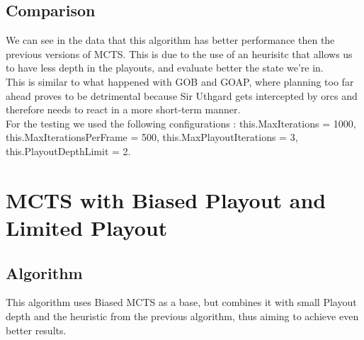 \documentclass{article}
\begin{document}
  \subsection{Comparison}
  We can see in the data that this algorithm has better performance then the previous versions of MCTS. This is due to the use of an heurisitc that allows us to have less
  depth in the playouts, and evaluate better the state we're in. \\
  This is similar to what happened with GOB and GOAP, where planning too far ahead proves to be detrimental because Sir Uthgard gets intercepted by orcs and 
  therefore needs to react in a more short-term manner.\\
  For the testing we used the following configurations : this.MaxIterations = 1000, this.MaxIterationsPerFrame = 500, this.MaxPlayoutIterations = 3,
  this.PlayoutDepthLimit = 2.

  \section{MCTS with Biased Playout and Limited Playout}

  \subsection{Algorithm}
  This algorithm uses Biased MCTS as a base, but combines it with small Playout depth and the heuristic from the previous algorithm, 
  thus aiming to achieve even better results.
  
\end{document}
